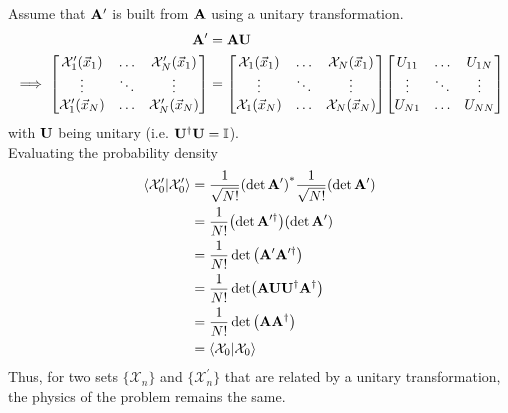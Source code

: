 \documentclass[12pt,a4paper,titlepage]{article}
\newcommand{\Chi}{\mathcal{X}} %
\newcommand{\id}{\mathbb{I}} %
\begin{document}
\newpage
Assume that $\vb{A}^{\prime}$ is built from $\vb{A}$ using a unitary transformation.
\begin{equation}
\begin{aligned}
\vb{A}^{\prime}&=\vb{A}\vb{U}\\
\implies\mqty[\Chi_{1}^{\prime}(\vec{x}_{1}) & \ldots & \Chi_{N}^{\prime}(\vec{x}_{1})\\ \vdots & \ddots & \vdots \\ \Chi_{1}^{\prime}(\vec{x}_{N}) & \ldots & \Chi_{N}^{\prime}(\vec{x}_{N})]&=\mqty[\Chi_{1}(\vec{x}_{1}) & \ldots & \Chi_{N}(\vec{x}_{1})\\ \vdots & \ddots & \vdots \\ \Chi_{1}(\vec{x}_{N}) & \ldots & \Chi_{N}(\vec{x}_{N})]\mqty[U_{11} & \ldots & U_{1N} \\ \vdots & \ddots & \vdots \\ U_{N1} & \ldots & U_{NN}]
\end{aligned}
\end{equation}
with $\vb{U}$ being unitary (i.e. $\vb{U}^{\dagger}\vb{U}=\id$).\\

Evaluating the probability density
\begin{equation}
\begin{aligned}
\ip{\Chi_{0}^{\prime}}{\Chi_{0}^{\prime}}&=\frac{1}{\sqrt{N!}}\qty(\det\vb{A}^{\prime})^{*}\frac{1}{\sqrt{N!}}\qty(\det\vb{A}^{\prime})\\
&=\frac{1}{N!}\qty(\det\vb{A}^{\prime\dagger})\qty(\det\vb{A}^{\prime})\\
&=\frac{1}{N!}\det\qty(\vb{A}^{\prime}\vb{A}^{\prime\dagger})\\
&=\frac{1}{N!}\det(\vb{A}\vb{U}\vb{U}^{\dagger}\vb{A}^{\dagger})\\
&=\frac{1}{N!}\det\qty(\vb{A}\vb{A}^{\dagger})\\
&=\ip{\Chi_{0}}{\Chi_{0}}
\end{aligned}
\end{equation}
Thus, for two sets $\{\Chi_{n}\}$ and $\{\Chi_{n}^{\prime}\}$ that are related by a unitary transformation, the physics of the problem remains the same.

\newpage
\end{document}
